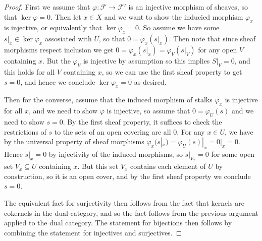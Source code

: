 \documentclass[11pt]{article}
\newcommand{\sheaf}{\mathcal{F}}
\begin{document}
\begin{proof}
  First we assume that $\varphi : \sheaf \rightarrow \sheaf'$ is an injective morphism of sheaves, so that $\ker \varphi = 0$.
  Then let $x \in X$ and we want to show the inducied morphism $\varphi_x$ is injective, or equivalently that $\ker \varphi_x = 0$.
  So assume we have some $s|_x \in \ker \varphi_x$ assosiated with $U$, so that $0 = \varphi_x(s|_x)$.
  Then note that since sheaf morphisms respect inclusion we get $0 = \varphi_x(s|_x) = \varphi_V(s|_V)$ for any open $V$ containing $x$.
  But the $\varphi_V$ is injective by assumption so this implies $S|_V = 0$, and this holds for all $V$ containing $x$, so we can use the first sheaf property to get $s = 0$, and hence we conclude $\ker \varphi_x = 0$ as desired.

  Then for the converse, assume that the induced morphism of stalks $\varphi_x$ is injective for all $x$, and we need to show $\varphi$ is injective, so assume that $0 = \varphi_U(s)$ and we need to show $s = 0$.
  By the first sheaf property, it suffices to check the restrictions of $s$ to the sets of an open covering are all $0$.
  For any $x \in U$, we have by the universal property of sheaf morphisms $\varphi_x(s|_x) = \varphi_U(s)|_x = 0|_x = 0$.
  Hence $s|_x = 0$ by injectivity of the induced morphisms, so $s|_{V_x} = 0$ for some open set $V_x \subseteq U$ containing $x$.
  But this set ${V_x}$ contains each element of $U$ by construction, so it is an open cover, and by the first sheaf property we conclude $s = 0$.

  The equivalent fact for surjectivity then follows from the fact that kernels are cokernels in the dual category, and so the fact follows from the previous argument applied to the dual category. The statement for bijections then follows by combining the statement for injectives and surjectives.
  
\end{proof}
\end{document}
